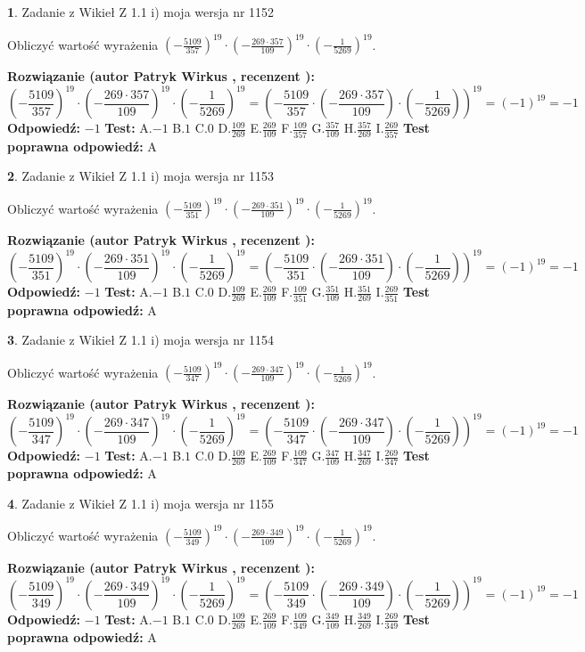 \documentclass[12pt, a4paper]{article}
\theoremstyle{definition} %
\newtheorem{zad}{}
\newcommand{\zadStart}[1]{\begin{zad}#1\newline}
\newcommand{\zadStop}{\end{zad}}
\newcommand{\rozwStart}[2]{\noindent \textbf{Rozwiązanie (autor #1 , recenzent #2): }\newline}
\newcommand{\rozwStop}{\newline}
\newcommand{\odpStart}{\noindent \textbf{Odpowiedź:}\newline}
\newcommand{\odpStop}{\newline}
\newcommand{\testStart}{\noindent \textbf{Test:}\newline}
\newcommand{\testStop}{\newline}
\newcommand{\kluczStart}{\noindent \textbf{Test poprawna odpowiedź:}\newline}
\newcommand{\kluczStop}{\newline}
\begin{document}
\zadStart{Zadanie z Wikieł Z 1.1 i) moja wersja nr 1152}

Obliczyć wartość wyrażenia $(-\frac{5109}{357})^{19} \cdot (-\frac{269 \cdot 357}{109})^{19} \cdot (-\frac{1}{5269})^{19}$.
\zadStop
\rozwStart{Patryk Wirkus}{}
$$(-\frac{5109}{357})^{19} \cdot (-\frac{269 \cdot 357}{109})^{19} \cdot (-\frac{1}{5269})^{19} = (-\frac{5109}{357} \cdot (-\frac{269 \cdot 357}{109}) \cdot (-\frac{1}{5269}))^{19} = (-1)^{19} = -1$$
\rozwStop
\odpStart
$-1$
\odpStop
\testStart
A.$-1$ B.$1$ C.$0$ D.$\frac{109}{269}$ E.$\frac{269}{109}$
F.$\frac{109}{357}$ G.$\frac{357}{109}$
H.$\frac{357}{269}$
I.$\frac{269}{357}$
\testStop
\kluczStart
A
\kluczStop



\zadStart{Zadanie z Wikieł Z 1.1 i) moja wersja nr 1153}

Obliczyć wartość wyrażenia $(-\frac{5109}{351})^{19} \cdot (-\frac{269 \cdot 351}{109})^{19} \cdot (-\frac{1}{5269})^{19}$.
\zadStop
\rozwStart{Patryk Wirkus}{}
$$(-\frac{5109}{351})^{19} \cdot (-\frac{269 \cdot 351}{109})^{19} \cdot (-\frac{1}{5269})^{19} = (-\frac{5109}{351} \cdot (-\frac{269 \cdot 351}{109}) \cdot (-\frac{1}{5269}))^{19} = (-1)^{19} = -1$$
\rozwStop
\odpStart
$-1$
\odpStop
\testStart
A.$-1$ B.$1$ C.$0$ D.$\frac{109}{269}$ E.$\frac{269}{109}$
F.$\frac{109}{351}$ G.$\frac{351}{109}$
H.$\frac{351}{269}$
I.$\frac{269}{351}$
\testStop
\kluczStart
A
\kluczStop



\zadStart{Zadanie z Wikieł Z 1.1 i) moja wersja nr 1154}

Obliczyć wartość wyrażenia $(-\frac{5109}{347})^{19} \cdot (-\frac{269 \cdot 347}{109})^{19} \cdot (-\frac{1}{5269})^{19}$.
\zadStop
\rozwStart{Patryk Wirkus}{}
$$(-\frac{5109}{347})^{19} \cdot (-\frac{269 \cdot 347}{109})^{19} \cdot (-\frac{1}{5269})^{19} = (-\frac{5109}{347} \cdot (-\frac{269 \cdot 347}{109}) \cdot (-\frac{1}{5269}))^{19} = (-1)^{19} = -1$$
\rozwStop
\odpStart
$-1$
\odpStop
\testStart
A.$-1$ B.$1$ C.$0$ D.$\frac{109}{269}$ E.$\frac{269}{109}$
F.$\frac{109}{347}$ G.$\frac{347}{109}$
H.$\frac{347}{269}$
I.$\frac{269}{347}$
\testStop
\kluczStart
A
\kluczStop



\zadStart{Zadanie z Wikieł Z 1.1 i) moja wersja nr 1155}

Obliczyć wartość wyrażenia $(-\frac{5109}{349})^{19} \cdot (-\frac{269 \cdot 349}{109})^{19} \cdot (-\frac{1}{5269})^{19}$.
\zadStop
\rozwStart{Patryk Wirkus}{}
$$(-\frac{5109}{349})^{19} \cdot (-\frac{269 \cdot 349}{109})^{19} \cdot (-\frac{1}{5269})^{19} = (-\frac{5109}{349} \cdot (-\frac{269 \cdot 349}{109}) \cdot (-\frac{1}{5269}))^{19} = (-1)^{19} = -1$$
\rozwStop
\odpStart
$-1$
\odpStop
\testStart
A.$-1$ B.$1$ C.$0$ D.$\frac{109}{269}$ E.$\frac{269}{109}$
F.$\frac{109}{349}$ G.$\frac{349}{109}$
H.$\frac{349}{269}$
I.$\frac{269}{349}$
\testStop
\kluczStart
A
\kluczStop
\end{document}
